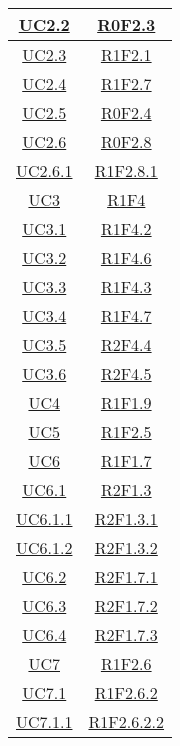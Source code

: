 \begin{longtable}{|c|c|}
\hline
\hyperlink{UC2.2}{UC2.2} & \hyperlink{R0F2.3}{R0F2.3}\\
\hline
\hyperlink{UC2.3}{UC2.3} & \hyperlink{R1F2.1}{R1F2.1}\\
\hline
\hyperlink{UC2.4}{UC2.4} & \hyperlink{R1F2.7}{R1F2.7}\\
\hline
\hyperlink{UC2.5}{UC2.5} & \hyperlink{R0F2.4}{R0F2.4}\\
\hline
\hyperlink{UC2.6}{UC2.6} & \hyperlink{R0F2.8}{R0F2.8}\\
\hline
\hyperlink{UC2.6.1}{UC2.6.1} & \hyperlink{R1F2.8.1}{R1F2.8.1}\\
\hline
\hyperlink{UC3}{UC3} & \hyperlink{R1F4}{R1F4}\\
\hline
\hyperlink{UC3.1}{UC3.1} & \hyperlink{R1F4.2}{R1F4.2}\\
\hline
\hyperlink{UC3.2}{UC3.2} & \hyperlink{R1F4.6}{R1F4.6}\\
\hline
\hyperlink{UC3.3}{UC3.3} & \hyperlink{R1F4.3}{R1F4.3}\\
\hline
\hyperlink{UC3.4}{UC3.4} & \hyperlink{R1F4.7}{R1F4.7}\\
\hline
\hyperlink{UC3.5}{UC3.5} & \hyperlink{R2F4.4}{R2F4.4}\\
\hline
\hyperlink{UC3.6}{UC3.6} & \hyperlink{R2F4.5}{R2F4.5}\\
\hline
\hyperlink{UC4}{UC4} & \hyperlink{R1F1.9}{R1F1.9}\\
\hline
\hyperlink{UC5}{UC5} & \hyperlink{R1F2.5}{R1F2.5}\\
\hline
\hyperlink{UC6}{UC6} & \hyperlink{R1F1.7}{R1F1.7}\\
\hline
\hyperlink{UC6.1}{UC6.1} & \hyperlink{R2F1.3}{R2F1.3}\\
\hline
\hyperlink{UC6.1.1}{UC6.1.1} & \hyperlink{R2F1.3.1}{R2F1.3.1}\\
\hline
\hyperlink{UC6.1.2}{UC6.1.2} & \hyperlink{R2F1.3.2}{R2F1.3.2}\\
\hline
\hyperlink{UC6.2}{UC6.2} & \hyperlink{R2F1.7.1}{R2F1.7.1}\\
\hline
\hyperlink{UC6.3}{UC6.3} & \hyperlink{R2F1.7.2}{R2F1.7.2}\\
\hline
\hyperlink{UC6.4}{UC6.4} & \hyperlink{R2F1.7.3}{R2F1.7.3}\\
\hline
\hyperlink{UC7}{UC7} & \hyperlink{R1F2.6}{R1F2.6}\\
\hline
\hyperlink{UC7.1}{UC7.1} & \hyperlink{R1F2.6.2}{R1F2.6.2}\\
\hline
\hyperlink{UC7.1.1}{UC7.1.1} & \hyperlink{R1F2.6.2.2}{R1F2.6.2.2}\\

\end{longtable}
